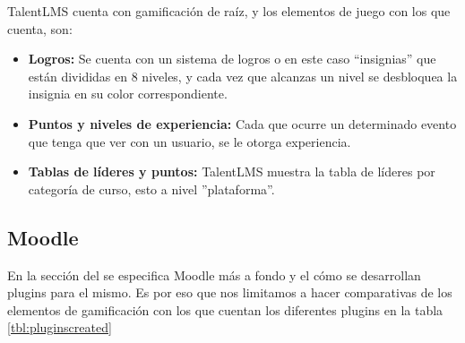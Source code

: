 \begin{multicols*}{2}
    \noindent TalentLMS cuenta con gamificación de raíz,
    y los elementos de juego con los que cuenta, son:
    
    \begin{itemize} 
    
        \item {\bf Logros:} Se cuenta con un sistema de logros o en este caso
        ``insignias'' que están divididas en 8 niveles, y cada vez que alcanzas
        un nivel se desbloquea la insignia en su color correspondiente.
        
        \item {\bf Puntos y niveles de experiencia:} Cada que ocurre un
        determinado evento que tenga que ver con un usuario, se le otorga experiencia.
        
        \item {\bf Tablas de líderes y puntos:} TalentLMS muestra la
        tabla de líderes por categoría de curso, esto a nivel ''plataforma''.
        
    \end{itemize}
    
\end{multicols*}



\clearpage
\subsection{Moodle}
   
En la sección del  se especifica Moodle más a fondo y el cómo se desarrollan plugins para el mismo. Es por eso que nos limitamos a hacer comparativas de los elementos de gamificación con los que cuentan los diferentes plugins en la tabla \ref{tbl:pluginscreated}

   

 

